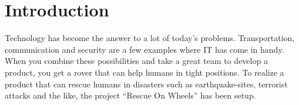 \section{Introduction}
Technology has become the answer to a lot of today's problems. Transportation, communication and security are a few examples where IT has come in handy. When you combine these possibilities and take a great team to develop a product, you get a rover that can help humans in tight positions. To realize a product that can rescue humans in disasters such as earthquake-sites, terrorist attacks and the like, the project ``Rescue On Wheels'' has been setup.
